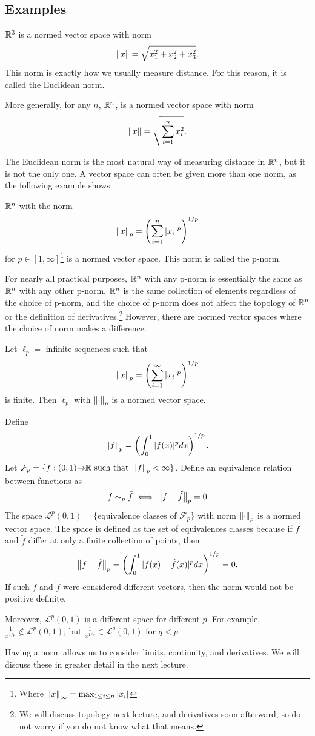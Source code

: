 \subsection{Examples}
\begin{example}
  $\mathbb{R}^3$ is a normed vector space with norm
  \[ \left\Vert {x} \right\Vert = \sqrt{x_1^2 + x_2^2 + x_3^2}. \] 
  This norm is exactly
  how we usually measure distance. For this reason, it is called the
  Euclidean norm.

  More generally, for any $n$, $\mathbb{R}^n$, is a normed vector space with
  norm 
  \[ \left\Vert {x} \right\Vert = \sqrt{\sum_{i=1}^n x_i^2 }. \]
\end{example}
The Euclidean norm is the most natural way of measuring distance in
$\mathbb{R}^n$, but it is not the only one.  A vector space can often be given
more than one norm, as the following example shows.
\begin{example}
  $\mathbb{R}^n$ with the norm 
  \[ \left\Vert {x} \right\Vert_p = \left( \sum_{i=1}^n |x_i|^p \right)^{1/p} \]
  for $p \in [1,\infty]$\footnote{Where $\left\Vert {x} \right\Vert_\infty = \max_{1\leq
      i \leq n} |x_i| $} is a normed vector space. This norm is called
  the p-norm. 
\end{example}
For nearly all practical purposes, $\mathbb{R}^n$ with any p-norm is
essentially the same as $\mathbb{R}^n$ with any other p-norm. $\mathbb{R}^n$ is the
same collection of elements regardless of the choice of p-norm, and
the choice of p-norm does not affect the topology of $\mathbb{R}^n$ or the
definition of derivatives.\footnote{We will discuss topology next
  lecture, and derivatives soon afterward, so do not worry if you do
  not know what that means.} However, there are normed vector spaces
where the choice of norm makes a difference.
\begin{example}
  Let $\ell_p =$ infinite sequences such that 
  \[ \left\Vert {x} \right\Vert_p = \left( \sum_{i=1}^\infty |x_i|^p \right)^{1/p} \]
  is finite. Then $\ell_p$ with $\left\Vert {\cdot} \right\Vert_p$ is a normed vector
  space. 
\end{example}
\begin{example}
  Define 
  \[ \left\Vert {f} \right\Vert_p = \left(\int_0^1 |f(x)|^p dx\right)^{1/p}. \]
  Let $\mathcal{F}_p = \{f: (0,1) {\rightarrow} \mathbb{R} \text{ such that }
  \left\Vert {f} \right\Vert_p<\infty\}$. 
  Define an equivalence relation between functions as
  \[ f \sim_p \tilde{f} \iff \left\Vert {f - \tilde{f}} \right\Vert_p = 0 \]
  The space  $\mathcal{L}^p(0,1) = \{\text{equivalence classes of
  }\mathcal{F}_p\}$ with norm $\left\Vert {\cdot} \right\Vert_p$ is a
  normed vector space. The space is defined as the set of equivalences
  classes because if $f$ and $\tilde{f}$ differ at only a finite
  collection of points, then
  \[ \left\Vert {f-\tilde{f}} \right\Vert_p = \left(\int_0^1 |f(x) - \tilde{f}(x) |^p dx\right)^{1/p} =
  0. \]
  If such $f$ and $\tilde{f}$ were considered different vectors, then
  the norm would not be positive definite. 
  
  Moreover, $\mathcal{L}^p(0,1)$ is a different
  space for different $p$. For example, $\frac{1}{x^{1/p}} \not\in
  \mathcal{L}^p(0,1)$, but $\frac{1}{x^{1/p}} \in \mathcal{L}^q(0,1)$
  for $q < p$. 
\end{example}
Having a norm allows us to consider limits, continuity, and
derivatives. We will discuss these in greater detail in the next
lecture.

